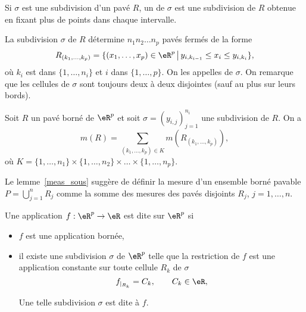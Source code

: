 
\begin{definition}
	Si \( \sigma\) est une subdivision d'un pavé \( R\), un  de \( \sigma\) est une subdivision de \( R\) obtenue en fixant plus de points dans chaque intervalle.
\end{definition}

La subdivision \( \sigma\) de \( R\) détermine \( n_1n_2\ldots n_p\) pavés fermés de la forme
\[
	R_{(k_1,\ldots,k_p)}=\{(x_1,\ldots, x_p)\in\eR^p\,\big\vert\, y_{i,k_{i-1}}\leq x_i\leq y_{i,k_i}\},
\]
où \( k_i\) est dans \( \{1,\ldots, n_i\}\) et \( i\) dans \( \{1,\ldots, p\}\). On les appelles  de \( \sigma\). On remarque que les cellules de \( \sigma\) sont toujours deux à deux disjointes (sauf au plus sur leurs bords).
\begin{lemma}\label{meas_sous}
	Soit \( R\) un pavé borné de \( \eR^p\) et soit \( \sigma=(y_{i,j})_{j=1}^{n_i}\) une subdivision de \( R\).
	On a
	\[
		m(R)=\sum_{(k_1,\ldots,k_p)\in K} m(R_{(k_1,\ldots,k_p)}),
	\]
	où \( K=\{1,\ldots,n_1\}\times\{1,\ldots,n_2\}\times\ldots \times\{1,\ldots,n_p\}\).
\end{lemma}
Le lemme~\ref{meas_sous} suggère de définir la mesure d'un ensemble borné pavable \( P=\bigcup_{j=1}^{n}R_j\) comme la somme des mesures des pavés disjoints \( R_j\), \( j=1,\ldots, n\).
\begin{definition}
	Une application \( f:\eR^p\to\eR\) est dite  sur \( \eR^p\) si
	\begin{itemize}
		\item \( f\) est une application bornée,
		\item il existe une subdivision \( \sigma\) de \( \eR^p\) telle que la restriction de \( f\)  est une application constante sur toute cellule \( R_k\) de \( \sigma\)
		      \[
			      f_{\vert_{R_k}}=C_k, \qquad C_k\in\eR,
		      \]

		      Une telle subdivision \( \sigma\) est dite  à \( f\).
	\end{itemize}
\end{definition}

